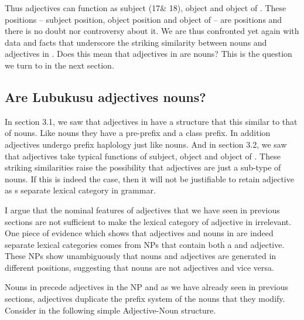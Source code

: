 \documentclass[output=paper,
modfonts
]{langscibook}
\begin{document}
Thus  adjectives can function as subject (17\& 18), object  and object of  . These positions – subject position, object position and object of  – are  positions and there is no doubt nor controversy about it. We are thus confronted yet again with data and facts that underscore the striking similarity between nouns and adjectives in . Does this mean that adjectives in  are nouns? This is the question we turn to in the next section.  

\subsection{Are Lubukusu adjectives nouns? }

In section 3.1, we saw that adjectives in  have a structure that this similar to that of nouns. Like nouns they have a pre-prefix and a class prefix. In addition adjectives undergo prefix haplology just like nouns. And in section 3.2, we saw that  adjectives take typical  functions of subject, object and object of . These striking similarities raise the possibility that adjectives are just a sub-type of nouns. If this is indeed the case, then it will not be justifiable to retain adjective as s separate lexical category in  grammar.

I argue that the nominal features of adjectives that we have seen in previous sections are not sufficient to make the lexical category of adjective in  irrelevant. One piece of evidence which shows that adjectives and nouns in  are indeed separate lexical categories comes from NPs that contain both a  and adjective. These NPs show unambiguously that nouns and adjectives are generated in different positions, suggesting that nouns are not adjectives and vice versa.

Nouns in  precede adjectives in the NP and as we have already seen in previous sections, adjectives duplicate the prefix system of the nouns that they modify. Consider  in the following simple Adjective-Noun structure.

\ea\label{ex:wasike:21}
\z
\z
\end{document}
